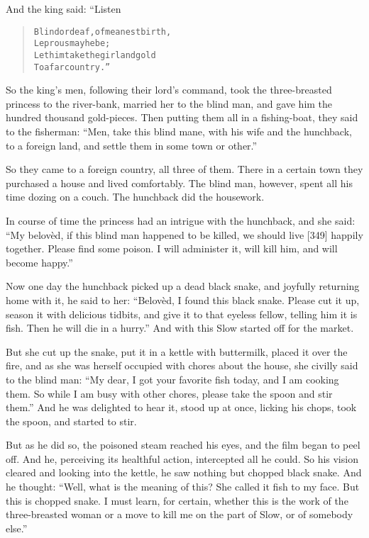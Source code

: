 \documentclass[article, twoside, 14pt]{memoir}
\renewenvironment{verbatim}{%
\begin{quote}%
\vskip -10pt%
\begin{alltt}\normalfont\large}{\end{alltt}%
\end{quote}%
\vskip -10pt
} %
\begin{document}
And the king said: “Listen

\begin{verbatim}
Blind or deaf, of meanest birth,
    Leprous may he be;
Let him take the girl and gold
    To a far country.”
\end{verbatim}
So the king's men, following their lord's command, took the
three-breasted princess to the river-bank, married her to the blind
man, and gave him the hundred thousand gold-pieces. Then putting
them all in a fishing-boat, they said to the fisherman:
``Men, take this blind mane, with his wife and the hunchback, to a foreign land, and settle them in some town or other.''

So they came to a foreign country, all three of them. There in a
certain town they purchased a house and lived comfortably. The
blind man, however, spent all his time dozing on a couch. The
hunchback did the housework.

In course of time the princess had an intrigue with the hunchback,
and she said:
``My belovèd, if this blind man happened to be killed, we should live [349] happily together. Please find some poison. I will administer it, will kill him, and will become happy.''

Now one day the hunchback picked up a dead black snake, and
joyfully returning home with it, he said to her:
``Belovèd, I found this black snake. Please cut it up, season it with delicious tidbits, and give it to that eyeless fellow, telling him it is fish. Then he will die in a hurry.''
And with this Slow started off for the market.

But she cut up the snake, put it in a kettle with buttermilk,
placed it over the fire, and as she was herself occupied with
chores about the house, she civilly said to the blind man:
``My dear, I got your favorite fish today, and I am cooking them. So while I am busy with other chores, please take the spoon and stir them.''
And he was delighted to hear it, stood up at once, licking his
chops, took the spoon, and started to stir.

But as he did so, the poisoned steam reached his eyes, and the film
began to peel off. And he, perceiving its healthful action,
intercepted all he could. So his vision cleared and looking into
the kettle, he saw nothing but chopped black snake. And he thought:
``Well, what is the meaning of this? She called it fish to my face. But this is chopped snake. I must learn, for certain, whether this is the work of the three-breasted woman or a move to kill me on the part of Slow, or of somebody else.''
\end{document}
